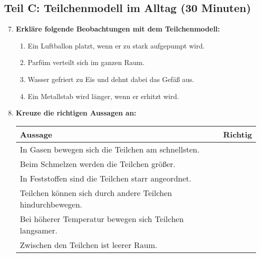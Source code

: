\subsection*{Teil C: Teilchenmodell im Alltag (30 Minuten)}

\begin{enumerate}[label=\arabic*.]
    \setcounter{enumi}{6}

    \item \textbf{Erkläre folgende Beobachtungen mit dem Teilchenmodell:}
    \vspace{0.5cm}

    \begin{enumerate}[label=\alph*)]
        \item Ein Luftballon platzt, wenn er zu stark aufgepumpt wird.
        \vspace{2cm}

        \item Parfüm verteilt sich im ganzen Raum.
        \vspace{2cm}

        \item Wasser gefriert zu Eis und dehnt dabei das Gefäß aus.
        \vspace{2cm}

        \item Ein Metallstab wird länger, wenn er erhitzt wird.
        \vspace{2cm}
    \end{enumerate}

    \vspace{1cm}

    \item \textbf{Kreuze die richtigen Aussagen an:}
    \vspace{0.5cm}

    \begin{tabularx}{\textwidth}{|x|c|}
        \hline
        \textbf{Aussage} & \textbf{Richtig} \\
        \hline
        In Gasen bewegen sich die Teilchen am schnellsten. & \\
        \hline
        Beim Schmelzen werden die Teilchen größer. & \\
        \hline
        In Feststoffen sind die Teilchen starr angeordnet. & \\
        \hline
        Teilchen können sich durch andere Teilchen hindurchbewegen. & \\
        \hline
        Bei höherer Temperatur bewegen sich Teilchen langsamer. & \\
        \hline
        Zwischen den Teilchen ist leerer Raum. & \\
        \hline
    \end{tabularx}

\end{enumerate}